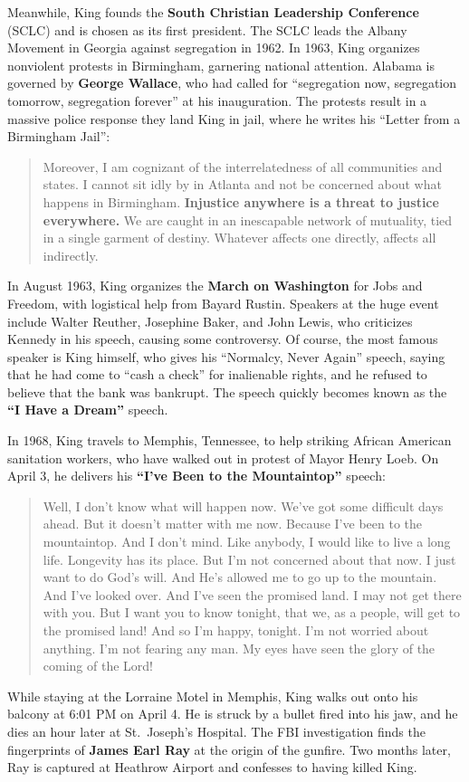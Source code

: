 Meanwhile, King founds the \textbf{South Christian Leadership Conference} (SCLC)
and is chosen as its first president.
The SCLC leads the Albany Movement in Georgia against segregation in 1962.
In 1963, King organizes nonviolent protests in Birmingham, garnering national attention.
Alabama is governed by \textbf{George Wallace},
who had called for ``segregation now, segregation tomorrow, segregation forever'' at his inauguration.
The protests result in a massive police response they land King in jail,
where he writes his ``Letter from a Birmingham Jail'':
\begin{quote}
  Moreover, I am cognizant of the interrelatedness of all communities and states.
  I cannot sit idly by in Atlanta and not be concerned about what happens in Birmingham.
  \textbf{Injustice anywhere is a threat to justice everywhere.}
  We are caught in an inescapable network of mutuality, tied in a single garment of destiny.
  Whatever affects one directly, affects all indirectly.
\end{quote}

In August 1963, King organizes the \textbf{March on Washington} for Jobs and Freedom,
with logistical help from Bayard Rustin.
Speakers at the huge event include Walter Reuther, Josephine Baker,
and John Lewis, who criticizes Kennedy in his speech, causing some controversy.
Of course, the most famous speaker is King himself, who gives his ``Normalcy, Never Again'' speech,
saying that he had come to ``cash a check'' for inalienable rights,
and he refused to believe that the bank was bankrupt.
The speech quickly becomes known as the \textbf{``I Have a Dream''} speech.

In 1968, King travels to Memphis, Tennessee, to help striking African American sanitation workers,
who have walked out in protest of Mayor Henry Loeb.
On April 3, he delivers his \textbf{``I've Been to the Mountaintop''} speech:
\begin{quote}
  Well, I don't know what will happen now.
  We've got some difficult days ahead.
  But it doesn't matter with me now.
  Because I've been to the mountaintop.
  And I don't mind.
  Like anybody, I would like to live a long life.
  Longevity has its place.
  But I'm not concerned about that now.
  I just want to do God's will.
  And He's allowed me to go up to the mountain.
  And I've looked over.
  And I've seen the promised land.
  I may not get there with you.
  But I want you to know tonight, that we, as a people, will get to the promised land!
  And so I'm happy, tonight.
  I'm not worried about anything.
  I'm not fearing any man.
  My eyes have seen the glory of the coming of the Lord!
\end{quote}
While staying at the Lorraine Motel in Memphis,
King walks out onto his balcony at 6:01 PM on April 4.
He is struck by a bullet fired into his jaw, and he dies an hour later at St.\ Joseph's Hospital.
The FBI investigation finds the fingerprints of \textbf{James Earl Ray} at the origin of the gunfire.
Two months later, Ray is captured at Heathrow Airport and confesses to having killed King.

